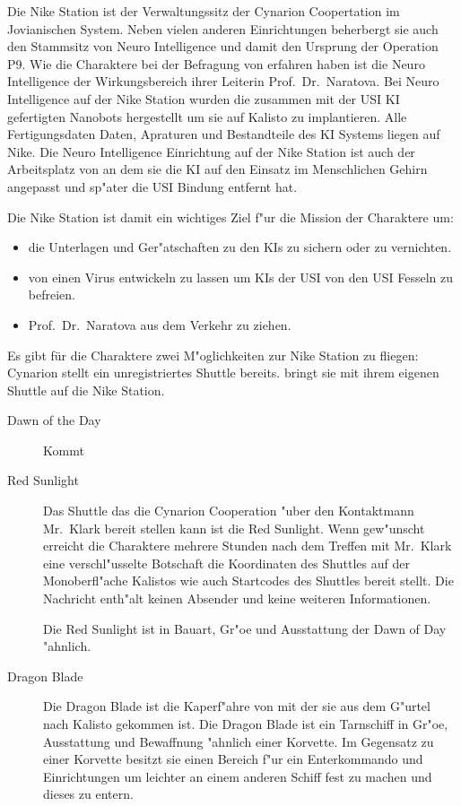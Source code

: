 
Die Nike Station ist der Verwaltungssitz der Cynarion Coopertation im Jovianischen System. Neben vielen anderen Einrichtungen beherbergt sie auch den Stammsitz von Neuro Intelligence und damit den Ursprung der Operation P9. Wie die Charaktere bei der Befragung von \ml{} erfahren haben ist die Neuro Intelligence der Wirkungsbereich ihrer Leiterin Prof.~Dr.~Naratova. Bei Neuro Intelligence auf der Nike Station wurden die zusammen mit der USI KI gefertigten Nanobots hergestellt um sie auf Kalisto zu implantieren. Alle Fertigungsdaten 
Daten, Apraturen und Bestandteile des KI Systems liegen auf Nike. Die Neuro Intelligence Einrichtung auf der Nike Station ist auch der
Arbeitsplatz von \ml{} an dem sie die KI auf den Einsatz im Menschlichen Gehirn angepasst und sp"ater die USI Bindung entfernt hat.

Die Nike Station ist damit ein wichtiges Ziel f"ur die Mission der Charaktere um:

\begin{itemize}
	\item die Unterlagen und Ger"atschaften zu den KIs zu sichern oder zu vernichten.
	\item von \ml{} einen Virus entwickeln zu lassen um KIs der USI von den USI Fesseln zu befreien.
	\item Prof.~Dr.~Naratova aus dem Verkehr zu ziehen.
\end{itemize}

Es gibt für die Charaktere zwei M"oglichkeiten zur Nike Station zu fliegen: Cynarion  stellt ein unregistriertes Shuttle bereits. \xl{} bringt sie mit ihrem eigenen Shuttle auf die Nike Station.

\begin{description}
	\item[Dawn of the Day] Kommt 
	\item[Red Sunlight] Das Shuttle das die Cynarion Cooperation "uber den Kontaktmann Mr.~Klark bereit stellen kann ist die Red Sunlight. 		Wenn gew"unscht erreicht die Charaktere mehrere Stunden nach dem Treffen mit Mr.~Klark eine verschl"usselte Botschaft die 		
		 Koordinaten des Shuttles auf der Monoberfl"ache Kalistos wie auch Startcodes des Shuttles bereit stellt. Die Nachricht enth"alt 
		 keinen Absender und keine weiteren Informationen.

		 Die Red Sunlight ist in Bauart, Gr"o\3e und Ausstattung der Dawn of Day "ahnlich.
	\item[Dragon Blade] Die Dragon Blade ist die Kaperf"ahre von \xl{} mit der sie aus dem G"urtel nach Kalisto gekommen ist.
		 Die Dragon Blade ist ein Tarnschiff in Gr"o\3e, Ausstattung und Bewaffnung "ahnlich einer Korvette. Im Gegensatz zu einer Korvette besitzt sie einen Bereich f"ur ein Enterkommando und Einrichtungen um leichter an einem anderen Schiff fest zu machen und dieses zu entern.


\end{description}





